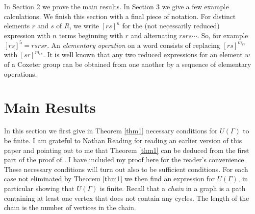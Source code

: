 \documentclass[a4paper,12pt]{article}
\theoremstyle{definition}
\begin{document}
 
 In Section 2 we prove the main results. In Section 3 we give a few example calculations. We finish this section with a final piece of notation. 
 For distinct elements $r$ and $s$ of $R$, we write $[rs]^{n}$ for the (not necessarily reduced) expression with $n$ terms beginning with $r$ and alternating $rsrs\cdots$. So, for example $[rs]^5 = rsrsr$. An {\em elementary operation} on a word consists of replacing $[rs]^{m_{rs}}$ with $[sr]^{m_{rs}}$. It is well known \cite{matsumoto} that any two reduced expressions for an element $w$ of a Coxeter group can be obtained from one another by a sequence of elementary operations. 
   
 
 \section{Main Results}
 
 In this section we first give in Theorem \ref{thm1} necessary conditions for $U(\Gamma)$ to  be finite. I am grateful to Nathan Reading for reading an earlier version of this paper and pointing out to me that Theorem \ref{thm1} can be deduced from the first part of the proof of \cite[Theorem 5.1]{stembridge}. I have included my proof here for the reader's convenience. These necessary conditions will turn out also to be sufficient conditions. For each case not eliminated by Theorem \ref{thm1} we then find an expression for $U(\Gamma)$, in particular showing that $U(\Gamma)$ is finite. Recall that a {\em chain} in a graph is a path containing at least one vertex that does not contain any cycles. The length of the chain is the number of vertices in the chain.
 
\end{document}
